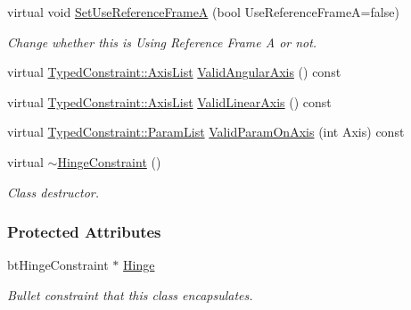 \begin{DoxyCompactItemize}
virtual void \hyperlink{classMezzanine_1_1HingeConstraint_a94a8a1c4b6febf1ca8859e7d3bf3c5ca}{SetUseReferenceFrameA} (bool UseReferenceFrameA=false)
\begin{DoxyCompactList}\small\item\em Change whether this is Using Reference Frame A or not. \item\end{DoxyCompactList}\item 
virtual \hyperlink{classMezzanine_1_1TypedConstraint_ac6b8e0839cd686f73d0c9e9ad5db47a4}{TypedConstraint::AxisList} \hyperlink{classMezzanine_1_1HingeConstraint_aaed95fc3750346a6f9791b025e600aa0}{ValidAngularAxis} () const 
\item 
virtual \hyperlink{classMezzanine_1_1TypedConstraint_ac6b8e0839cd686f73d0c9e9ad5db47a4}{TypedConstraint::AxisList} \hyperlink{classMezzanine_1_1HingeConstraint_a2af69ea5320ff27bf4d5de7ae9530594}{ValidLinearAxis} () const 
\item 
virtual \hyperlink{classMezzanine_1_1TypedConstraint_abd499db29c9e9755e9bb547d29eaa49a}{TypedConstraint::ParamList} \hyperlink{classMezzanine_1_1HingeConstraint_a3ea048fe9e7eda83e4ef42174a0c6157}{ValidParamOnAxis} (int Axis) const 
\item 
virtual \hyperlink{classMezzanine_1_1HingeConstraint_a9964c958874d5c6c7d410b4c09818837}{$\sim$HingeConstraint} ()
\begin{DoxyCompactList}\small\item\em Class destructor. \item\end{DoxyCompactList}\end{DoxyCompactItemize}
\subsubsection*{Protected Attributes}
\begin{DoxyCompactItemize}
\item 
\hypertarget{classMezzanine_1_1HingeConstraint_a5d199b12753d7143ddd521d5f4728b45}{
btHingeConstraint $\ast$ \hyperlink{classMezzanine_1_1HingeConstraint_a5d199b12753d7143ddd521d5f4728b45}{Hinge}}
\label{classMezzanine_1_1HingeConstraint_a5d199b12753d7143ddd521d5f4728b45}

\begin{DoxyCompactList}\small\item\em Bullet constraint that this class encapsulates. \item\end{DoxyCompactList}\end{DoxyCompactItemize}



